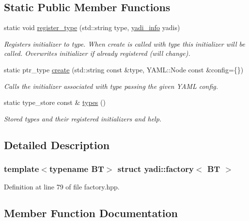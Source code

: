 \subsection*{Static Public Member Functions}
\begin{DoxyCompactItemize}
\item 
static void \hyperlink{structyadi_1_1factory_a512c17ea9ca1bde8dec81c22b08e5278}{register\+\_\+type} (std\+::string type, \hyperlink{structyadi_1_1factory_1_1yadi__info}{yadi\+\_\+info} yadis)
\begin{DoxyCompactList}\small\item\em Registers initializer to type. When create is called with type this initializer will be called. Overwrites initializer if already registered (will change). \end{DoxyCompactList}\item 
static ptr\+\_\+type \hyperlink{structyadi_1_1factory_a600474900d2c6fa5d09935a641298bd5}{create} (std\+::string const \&type, Y\+A\+M\+L\+::\+Node const \&config=\{\})
\begin{DoxyCompactList}\small\item\em Calls the initializer associated with type passing the given Y\+A\+ML config. \end{DoxyCompactList}\item 
static type\+\_\+store const  \& \hyperlink{structyadi_1_1factory_aa167d70b963561d24c8a32f680d7e8c0}{types} ()
\begin{DoxyCompactList}\small\item\em Stored types and their registered initializers and help. \end{DoxyCompactList}\end{DoxyCompactItemize}


\subsection{Detailed Description}
\subsubsection*{template$<$typename BT$>$\newline
struct yadi\+::factory$<$ B\+T $>$}



Definition at line 79 of file factory.\+hpp.



\subsection{Member Function Documentation}
\mbox{\label{structyadi_1_1factory_a600474900d2c6fa5d09935a641298bd5}} 
